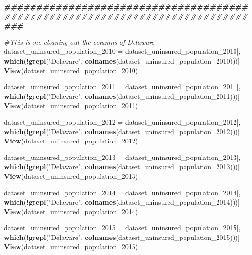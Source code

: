 \documentclass[
]{article}
\newenvironment{Shaded}{\begin{snugshade}}{\end{snugshade}}
\newcommand{\CommentTok}[1]{\textcolor[rgb]{0.56,0.35,0.01}{\textit{#1}}}
\newcommand{\DocumentationTok}[1]{\textcolor[rgb]{0.56,0.35,0.01}{\textbf{\textit{#1}}}}
\newcommand{\FunctionTok}[1]{\textcolor[rgb]{0.13,0.29,0.53}{\textbf{#1}}}
\newcommand{\NormalTok}[1]{#1}
\newcommand{\OtherTok}[1]{\textcolor[rgb]{0.56,0.35,0.01}{#1}}
\newcommand{\SpecialCharTok}[1]{\textcolor[rgb]{0.81,0.36,0.00}{\textbf{#1}}}
\newcommand{\StringTok}[1]{\textcolor[rgb]{0.31,0.60,0.02}{#1}}
\begin{document}
\begin{Shaded}
\begin{Highlighting}[]
\DocumentationTok{\#\#\#\#\#\#\#\#\#\#\#\#\#\#\#\#\#\#\#\#\#\#\#\#\#\#\#\#\#\#\#\#\#\#\#\#\#\#\#\#\#\#\#\#\#\#\#\#\#\#\#\#\#\#\#\#\#\#\#\#\#\#\#\#\#\#\#\#\#\#\#\#\#\#\#\#\#\#\#}

\CommentTok{\#This is me cleaning out the columns of Delaware}
\NormalTok{dataset\_uninsured\_population\_2010 }\OtherTok{=}\NormalTok{ dataset\_uninsured\_population\_2010[, }\FunctionTok{which}\NormalTok{(}\SpecialCharTok{!}\FunctionTok{grepl}\NormalTok{(}\StringTok{"Delaware"}\NormalTok{, }\FunctionTok{colnames}\NormalTok{(dataset\_uninsured\_population\_2010)))]}
\FunctionTok{View}\NormalTok{(dataset\_uninsured\_population\_2010)}

\NormalTok{dataset\_uninsured\_population\_2011 }\OtherTok{=}\NormalTok{ dataset\_uninsured\_population\_2011[, }\FunctionTok{which}\NormalTok{(}\SpecialCharTok{!}\FunctionTok{grepl}\NormalTok{(}\StringTok{"Delaware"}\NormalTok{, }\FunctionTok{colnames}\NormalTok{(dataset\_uninsured\_population\_2011)))]}
\FunctionTok{View}\NormalTok{(dataset\_uninsured\_population\_2011)}

\NormalTok{dataset\_uninsured\_population\_2012 }\OtherTok{=}\NormalTok{ dataset\_uninsured\_population\_2012[, }\FunctionTok{which}\NormalTok{(}\SpecialCharTok{!}\FunctionTok{grepl}\NormalTok{(}\StringTok{"Delaware"}\NormalTok{, }\FunctionTok{colnames}\NormalTok{(dataset\_uninsured\_population\_2012)))]}
\FunctionTok{View}\NormalTok{(dataset\_uninsured\_population\_2012)}

\NormalTok{dataset\_uninsured\_population\_2013 }\OtherTok{=}\NormalTok{ dataset\_uninsured\_population\_2013[, }\FunctionTok{which}\NormalTok{(}\SpecialCharTok{!}\FunctionTok{grepl}\NormalTok{(}\StringTok{"Delaware"}\NormalTok{, }\FunctionTok{colnames}\NormalTok{(dataset\_uninsured\_population\_2013)))]}
\FunctionTok{View}\NormalTok{(dataset\_uninsured\_population\_2013)}

\NormalTok{dataset\_uninsured\_population\_2014 }\OtherTok{=}\NormalTok{ dataset\_uninsured\_population\_2014[, }\FunctionTok{which}\NormalTok{(}\SpecialCharTok{!}\FunctionTok{grepl}\NormalTok{(}\StringTok{"Delaware"}\NormalTok{, }\FunctionTok{colnames}\NormalTok{(dataset\_uninsured\_population\_2014)))]}
\FunctionTok{View}\NormalTok{(dataset\_uninsured\_population\_2014)}

\NormalTok{dataset\_uninsured\_population\_2015 }\OtherTok{=}\NormalTok{ dataset\_uninsured\_population\_2015[, }\FunctionTok{which}\NormalTok{(}\SpecialCharTok{!}\FunctionTok{grepl}\NormalTok{(}\StringTok{"Delaware"}\NormalTok{, }\FunctionTok{colnames}\NormalTok{(dataset\_uninsured\_population\_2015)))]}
\FunctionTok{View}\NormalTok{(dataset\_uninsured\_population\_2015)}


\end{Highlighting}
\end{Shaded}
\end{document}
